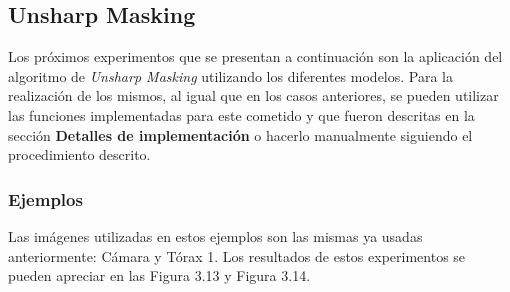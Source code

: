 \subsection{Unsharp Masking}

Los pr\'oximos experimentos que se presentan a continuaci\'on son la aplicaci\'on del algoritmo de \textit{Unsharp Masking} utilizando los diferentes modelos. Para la realizaci\'on de los mismos, al igual que en los casos anteriores, se pueden utilizar las funciones implementadas para este cometido y que fueron descritas en la secci\'on \textbf{Detalles de implementaci\'on} o hacerlo manualmente siguiendo el procedimiento descrito.

\subsubsection{Ejemplos}

Las im\'agenes utilizadas en estos ejemplos son las mismas ya usadas anteriormente: C\'amara y T\'orax 1. Los resultados de estos experimentos se pueden apreciar en las Figura 3.13 y Figura 3.14.


